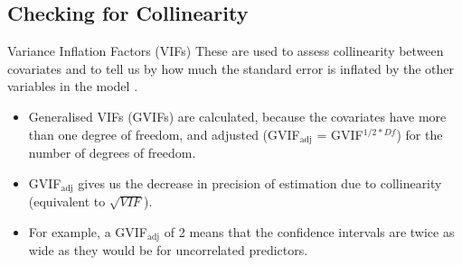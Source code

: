 \subsection{Checking for Collinearity}
\label{subsec:vifs}
\begin{frame}[fragile]
\begin{block}{Variance Inflation Factors (VIFs)}
These are used to assess collinearity between covariates and to tell us by how much the standard error is inflated by the other variables in the model \citep{Fox2011}.
\end{block}

\begin{itemize}
\item Generalised VIFs (GVIFs) are calculated, because the covariates have more than one degree of freedom, and adjusted (GVIF$_{\textrm{adj}}$ = GVIF$^{1/2*Df}$) for the number of degrees of freedom.
\item GVIF$_{\textrm{adj}}$ gives us the decrease in precision of estimation due to collinearity (equivalent to $\sqrt{VIF}$). 
\item For example, a GVIF$_{\textrm{adj}}$ of 2 means that the confidence intervals are twice as wide as they would be for uncorrelated predictors.
\end{itemize}
\end{frame}

